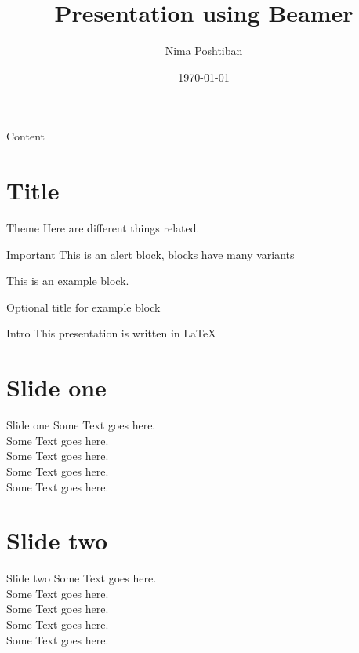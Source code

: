\documentclass{beamer} %
\title{Presentation using Beamer}
\author{Nima Poshtiban}
\date{\today}
\institute{Azad University of Qom}
\begin{document}
\frame{\titlepage} %


\begin{frame}{Content} %
	\tableofcontents
\end{frame}


\section{Title} %
\begin{block}{Theme}  %
	Here are different things related.
\end{block}\pause %
\begin{alertblock}{Important} %
	This is an alert block, blocks have many variants 
\end{alertblock}
\begin{example}
	 This is an example block.
\end{example}{Optional title for example block}


\begin{frame}{Intro} 
	This presentation is written in \alert{\LaTeX} %
\end{frame}


\section{Slide one}
\begin{frame}{Slide one}
	Some Text goes here.\\
	Some Text goes here.\\Some Text goes here.\\Some Text goes here.\\Some Text goes here.\\
\end{frame}

\section{Slide two}
\begin{frame}{Slide two}
	Some Text goes here.\\
	Some Text goes here.\\Some Text goes here.\\Some Text goes here.\\Some Text goes here.\\
\end{frame}
\end{document}
